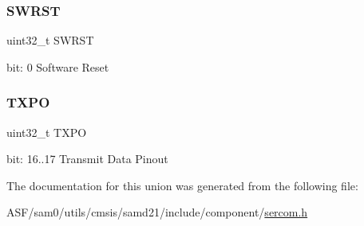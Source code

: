 \subsubsection{\texorpdfstring{SWRST}{SWRST}}
{\footnotesize\ttfamily uint32\+\_\+t S\+W\+R\+ST}

bit\+: 0 Software Reset \mbox{\label{union_s_e_r_c_o_m___u_s_a_r_t___c_t_r_l_a___type_a60f2ff8502d52acbfb411cf58dd75dcb}} 
\subsubsection{\texorpdfstring{TXPO}{TXPO}}
{\footnotesize\ttfamily uint32\+\_\+t T\+X\+PO}

bit\+: 16..17 Transmit Data Pinout 

The documentation for this union was generated from the following file\+:\begin{DoxyCompactItemize}
\item 
A\+S\+F/sam0/utils/cmsis/samd21/include/component/\mbox{\hyperlink{utils_2cmsis_2samd21_2include_2component_2sercom_8h}{sercom.\+h}}\end{DoxyCompactItemize}
